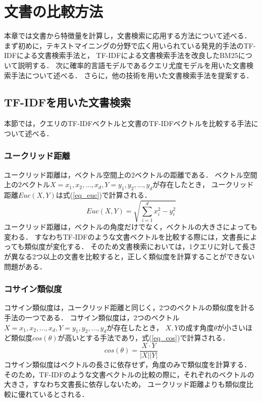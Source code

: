 \chapter{文書の比較方法}
本章では文書から特徴量を計算し，文書検索に応用する方法について述べる．
まず初めに，テキストマイニングの分野で広く用いられている発見的手法のTF-IDFによる文書検索手法と，
TF-IDFによる文書検索手法を改良したBM25について説明する．
次に確率的言語モデルであるクエリ尤度モデルを用いた文書検索手法について述べる．
さらに，他の技術を用いた文書検索手法を提案する．
\section{TF-IDFを用いた文書検索}
本節では，クエリのTF-IDFベクトルと文書のTF-IDFベクトルを比較する手法について述べる．
\subsection{ユークリッド距離}
ユークリッド距離は，ベクトル空間上の2ベクトルの距離である．
ベクトル空間上の2ベクトル$X = {x_1, x_2, ..., x_d}, Y = {y_1, y_2, ..., y_d}$が存在したとき，
ユークリッド距離$Euc(X, Y)$は式(\ref{eq_euc})で計算される．
\begin{equation}
    Euc(X, Y) = \sqrt{\sum^{d}_{i=1}{x_i^2 - y_i^2}}    \label{eq_euc}
\end{equation}
ユークリッド距離は，ベクトルの角度だけでなく，ベクトルの大きさによっても変わる．
すなわちTF-IDFのような文書ベクトルを比較する際には，文書長によっても類似度が変化する．
そのため文書検索においては，1クエリに対して長さが異なる2つ以上の文書を比較すると，正しく類似度を計算することができない問題がある．

\subsection{コサイン類似度} \label{sec_cosine}
コサイン類似度は，ユークリッド距離と同じく，2つのベクトルの類似度を計る手法の一つである．
コサイン類似度は，2つのベクトル$X = {x_1, x_2, ..., x_d}, Y = {y_1, y_2, ..., y_d}$が存在したとき，
$X, Y$の成す角度$\theta$が小さいほど類似度$cos(\theta)$が高いとする手法であり，式(\ref{eq_cos})で計算される．
\begin{equation}
    cos(\theta) = \frac{X \cdot Y}{|X||Y|}  \label{eq_cos}
\end{equation}
コサイン類似度はベクトルの長さに依存せず，角度のみで類似度を計算する．
そのため，TF-IDFのような文書ベクトルの比較の際に，それぞれのベクトルの大きさ，すなわち文書長に依存しないため，
ユークリッド距離よりも類似度比較に優れているとされる．

